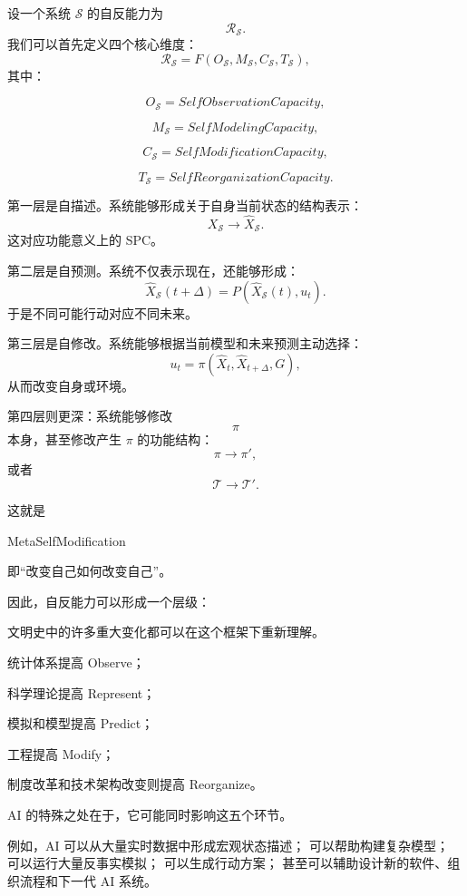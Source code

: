 设一个系统 $\mathcal{S}$ 的自反能力为
\[
\mathcal{R}_{\mathcal S}.
\]
我们可以首先定义四个核心维度：
\[
\mathcal{R}_{\mathcal S}
=
F(
O_{\mathcal S},
M_{\mathcal S},
C_{\mathcal S},
T_{\mathcal S}
),
\]
其中：

\[
O_{\mathcal S}
=
SelfObservationCapacity,
\]

\[
M_{\mathcal S}
=
SelfModelingCapacity,
\]

\[
C_{\mathcal S}
=
SelfModificationCapacity,
\]

\[
T_{\mathcal S}
=
SelfReorganizationCapacity.
\]

第一层是自描述。系统能够形成关于自身当前状态的结构表示：
\[
X_{\mathcal S}
\rightarrow
\hat X_{\mathcal S}.
\]
这对应功能意义上的 SPC。

第二层是自预测。系统不仅表示现在，还能够形成：
\[
\hat X_{\mathcal S}(t+\Delta)
=
P(
\hat X_{\mathcal S}(t),
u_t
).
\]
于是不同可能行动对应不同未来。

第三层是自修改。系统能够根据当前模型和未来预测主动选择：
\[
u_t
=
\pi(
\hat X_t,
\hat X_{t+\Delta},
G
),
\]
从而改变自身或环境。

第四层则更深：系统能够修改
\[
\pi
\]
本身，甚至修改产生 $\pi$ 的功能结构：
\[
\pi
\rightarrow
\pi',
\]
或者
\[
\mathcal T
\rightarrow
\mathcal T'.
\]

这就是
\begin{statementbox}
MetaSelfModification
\end{statementbox}
即“改变自己如何改变自己”。

因此，自反能力可以形成一个层级：

\begin{statementbox}
\centering
{}
\end{statementbox}

文明史中的许多重大变化都可以在这个框架下重新理解。

统计体系提高 Observe；

科学理论提高 Represent；

模拟和模型提高 Predict；

工程提高 Modify；

制度改革和技术架构改变则提高 Reorganize。

AI 的特殊之处在于，它可能同时影响这五个环节。

例如，AI 可以从大量实时数据中形成宏观状态描述；
可以帮助构建复杂模型；
可以运行大量反事实模拟；
可以生成行动方案；
甚至可以辅助设计新的软件、组织流程和下一代 AI 系统。

